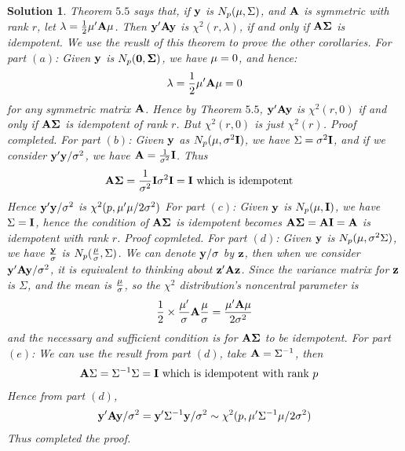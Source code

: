 \documentclass[11pt]{article}
\newtheorem{sol}{Solution}
\begin{document}
\begin{sol}
	Theorem $5.5$ says that, if ${\bf y}$ is $N_p({\bf \mu}, \Sigma)$, and ${\bf A}$ is symmetric with rank $r$, let $\lambda = \frac{1}{2}{\bf \mu}'{\bf A}{\bf \mu}$. Then ${\bf y}'{\bf A}{\bf y}$ is $\chi^2(r, \lambda)$, if and only if ${\bf A}{\bf \Sigma}$ is idempotent. We use the reuslt of this theorem to prove the other corollaries.\vskip 2mm
	For part $(a)$:\vskip 2mm
	Given ${\bf y}$ is $N_p({\bf 0}, {\bf \Sigma})$, we have ${\bf \mu} = 0$, and hence:
	\begin{align*}
		\lambda = \frac{1}{2}{\bf \mu}'{\bf A}{\bf \mu} = 0
	\end{align*}
	for any symmetric matrix ${\bf A}$.\vskip 2mm
	Hence by Theorem $5.5$, ${\bf y}'{\bf A}{\bf y}$ is $\chi^2(r,0)$ if and only if ${\bf A}{\bf \Sigma}$ is idempotent of rank $r$. But $\chi^2(r, 0)$ is just $\chi^2(r)$. Proof completed.\vskip 2mm
	For part $(b)$:\vskip 2mm
	Given ${\bf y}$ as $N_p({\bf \mu}, \sigma^2{\bf I})$, we have $\Sigma = \sigma^2{\bf I}$, and if we consider ${\bf y}'{\bf y}/\sigma^2$, we have ${\bf A} = \frac{1}{\sigma^2}{\bf I}$.\vskip 2mm
	Thus 
	\begin{align*}
		{\bf A}{\bf \Sigma} &= \frac{1}{\sigma^2}{\bf I}\sigma^2{\bf I} = {\bf I} \text{ which is idempotent}
	\end{align*}
	Hence ${\bf y}'{\bf y}/\sigma^2$ is $\chi^2(p, {\bf \mu}'{\bf \mu}/2\sigma^2)$\vskip 2mm
	For part $(c)$:\vskip 2mm
	Given ${\bf y}$ is $N_p({\bf \mu}, {\bf I})$, we have $\Sigma = {\bf I}$, hence the condition of ${\bf A}{\bf \Sigma}$ is idempotent becomes ${\bf A}{\bf \Sigma} = {\bf A}{\bf I} = {\bf A}$ is idempotent with rank $r$. Proof copmleted.\vskip 2mm
	For part $(d)$:\vskip 2mm
	Given ${\bf y}$ is $N_p({\bf \mu}, \sigma^2\Sigma)$, we have $\frac{{\bf y}}{\sigma}$ is $N_p(\frac{{\bf \mu}}{\sigma}, \Sigma)$. We can denote ${\bf y}/\sigma$ by ${\bf z}$, then when we consider ${\bf y}'{\bf A}{\bf y}/\sigma^2$, it is equivalent to thinking about ${\bf z}'{\bf A}{\bf z}$. Since the variance matrix for ${\bf z}$ is $\Sigma$, and the mean is $\frac{{\bf \mu}}{\sigma}$, so the $\chi^2$ distribution's noncentral parameter is 
	\begin{align*}
		\frac{1}{2}\times \frac{{\bf \mu}'}{\sigma}{\bf A}\frac{{\bf \mu}}{\sigma} = \frac{{\bf \mu}'{\bf A}{\bf \mu}}{2\sigma^2}
	\end{align*}
	and the necessary and sufficient condition is for ${\bf A}{\bf \Sigma}$ to be idempotent.\vskip 2mm
	For part $(e)$:\vskip 2mm
	We can use the result from part $(d)$, take ${\bf A} = \Sigma^{-1}$, then 
	\begin{align*}
		{\bf A}{\Sigma} &= \Sigma^{-1}\Sigma = {\bf I} \text{ which is idempotent with rank } p
	\end{align*}
	Hence from part $(d)$, 
	\begin{align*}
		{\bf y}'{\bf A}{\bf y}/\sigma^2 = {\bf y}'\Sigma^{-1}{\bf y}/\sigma^2 \sim \chi^2(p, {\bf \mu}'\Sigma^{-1}{\bf \mu}/2\sigma^2)
	\end{align*}	
	Thus completed the proof.
\end{sol}
\end{document}
